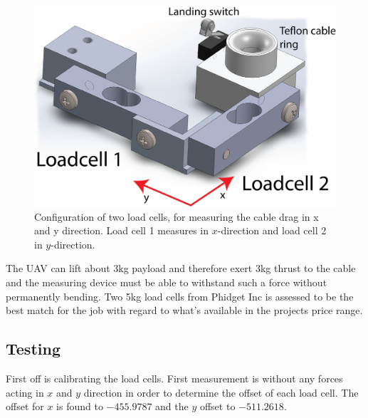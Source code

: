 \begin{figure}[hbtp]
\centering
\includegraphics[scale=0.75]{graphics/cad/loadcell.png}
\caption[Configuration of two load cells, for measuring the cable drag]{Configuration of two load cells, for measuring the cable drag in x and y direction. Load cell 1 measures in $x$-direction and load cell 2 in $y$-direction.}
\label{fig:loadcells}
\end{figure}

\noindent
The UAV can lift about 3kg payload and therefore exert 3kg thrust to the cable and the measuring device must be able to withstand such a force without permanently bending. Two 5kg load cells from Phidget Inc is assessed to be the best match for the job with regard to what's available in the projects price range.

\subsection{Testing}
First off is calibrating the load cells. First measurement is without any forces acting in $x$ and $y$ direction in order to determine the offset of each load cell.
The offset for $x$ is found to $-455.9787$ and the $y$ offset to $-511.2618$.\\


